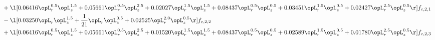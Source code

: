 \begin{alignat}{2}
& + \l[  0.06416 \opL_r^{0.5} \opL_z^{1.5} +  0.05661 \opL_r^{0.5} \opL_z^{2.5} +  0.02027 \opL_r^{1.5} \opL_z^{1.5} +  0.08437 \opL_r^{0.5} \opL_z^{0.5} +  0.03451 \opL_r^{1.5} \opL_z^{0.5} +  0.02427 \opL_r^{2.5} \opL_z^{0.5}  \r] f_{c,2,1} \nonumber \\ 
& - \l[  0.03250 \opL_r \opL_z^{1.5} + \frac{1}{21} \opL_r \opL_z^{0.5} +  0.02525 \opL_r^{2.0} \opL_z^{0.5}  \r] f_{c,2,2} \nonumber \\ 
& + \l[  0.06416 \opL_r^{0.5} \opL_z^{1.5} +  0.05661 \opL_r^{0.5} \opL_z^{2.5} +  0.01520 \opL_r^{1.5} \opL_z^{1.5} +  0.08437 \opL_r^{0.5} \opL_z^{0.5} +  0.02589 \opL_r^{1.5} \opL_z^{0.5} +  0.01780 \opL_r^{2.5} \opL_z^{0.5}  \r] f_{c,2,3} \nonumber \\ 
\end{alignat} 


